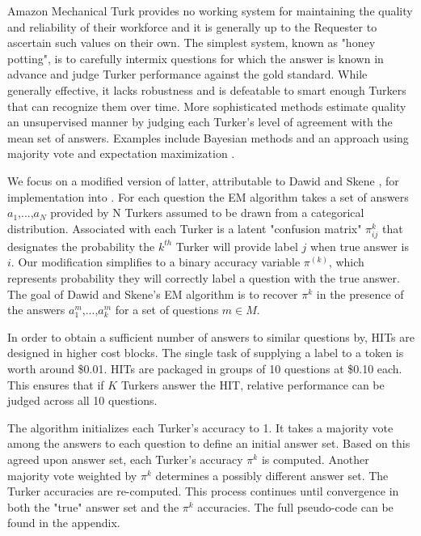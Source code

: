 Amazon Mechanical Turk provides no working system for maintaining the quality and reliability of their workforce and it is generally up to the Requester to ascertain such values on their own.  The simplest system, known as "honey potting", is to carefully intermix questions for which the answer is known in advance and judge Turker performance against the gold standard.  While generally effective, it lacks robustness and is defeatable to smart enough Turkers that can recognize them over time.  More sophisticated methods estimate quality an unsupervised manner by judging each Turker's level of agreement with the mean set of answers.  Examples include Bayesian \cite{citeulike:9437699, DBLP:journals/jmlr/RaykarY12} methods and an approach using majority vote and expectation maximization \cite{Ipeirotis:2010:QMA:1837885.1837906}.

We focus on a modified version of latter, attributable to Dawid and Skene \cite{1979}, for implementation into \sysName .  For each question the EM algorithm takes a set of answers $a_{1}$,...,$a_{N}$ provided by N Turkers assumed to be drawn from a categorical distribution.  Associated with each Turker is a latent "confusion matrix" $\pi^{k}_{ij}$ that designates the probability the $k^{th}$ Turker will provide label $j$ when true answer is $i$.  Our modification simplifies to a binary accuracy variable $\pi^(k)$, which represents probability they will correctly label a question with the true answer.  The goal of Dawid and Skene's EM algorithm is to recover $\pi^{k}$ in the presence of the answers $a^{m}_{1}$,...,$a^{m}_{k}$ for a set of questions $m \in M$.

In order to obtain a sufficient number of answers to similar questions by, HITs are designed in higher cost blocks.  The single task of supplying a label to a token is worth around \$0.01.  HITs are packaged in groups of 10 questions at \$0.10 each.  This ensures that if $K$ Turkers answer the HIT, relative performance can be judged across all 10 questions.

The algorithm initializes each Turker's accuracy to 1.  It takes a majority vote among the answers to each question to define an initial answer set.  Based on this agreed upon answer set, each Turker's accuracy $\pi^{k}$ is computed.  Another majority vote weighted by $\pi^{k}$ determines a possibly different answer set.  The Turker accuracies are re-computed.  This process continues until convergence in both the "true" answer set and the $\pi^{k}$ accuracies.  The full pseudo-code can be found in the appendix.

